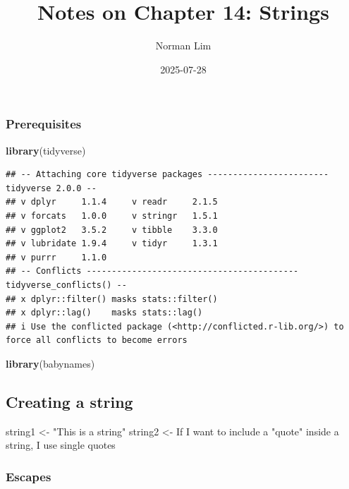 \documentclass[
]{article}
\title{Notes on Chapter 14: Strings}
\author{Norman Lim}
\date{2025-07-28}
\newenvironment{Shaded}{\begin{snugshade}}{\end{snugshade}}
\newcommand{\FunctionTok}[1]{\textcolor[rgb]{0.13,0.29,0.53}{\textbf{#1}}}
\newcommand{\NormalTok}[1]{#1}
\newcommand{\OtherTok}[1]{\textcolor[rgb]{0.56,0.35,0.01}{#1}}
\newcommand{\StringTok}[1]{\textcolor[rgb]{0.31,0.60,0.02}{#1}}
\begin{document}
\maketitle

\subsubsection{Prerequisites}\label{prerequisites}

\begin{Shaded}
\begin{Highlighting}[]
\FunctionTok{library}\NormalTok{(tidyverse)}
\end{Highlighting}
\end{Shaded}

\begin{verbatim}
## -- Attaching core tidyverse packages ------------------------ tidyverse 2.0.0 --
## v dplyr     1.1.4     v readr     2.1.5
## v forcats   1.0.0     v stringr   1.5.1
## v ggplot2   3.5.2     v tibble    3.3.0
## v lubridate 1.9.4     v tidyr     1.3.1
## v purrr     1.1.0     
## -- Conflicts ------------------------------------------ tidyverse_conflicts() --
## x dplyr::filter() masks stats::filter()
## x dplyr::lag()    masks stats::lag()
## i Use the conflicted package (<http://conflicted.r-lib.org/>) to force all conflicts to become errors
\end{verbatim}

\begin{Shaded}
\begin{Highlighting}[]
\FunctionTok{library}\NormalTok{(babynames)}
\end{Highlighting}
\end{Shaded}

\subsection{Creating a string}\label{creating-a-string}

\begin{Shaded}
\begin{Highlighting}[]
\NormalTok{string1 }\OtherTok{\textless{}{-}} \StringTok{"This is a string"}
\NormalTok{string2 }\OtherTok{\textless{}{-}} \StringTok{\textquotesingle{}If I want to include a "quote" inside a string, I use single quotes\textquotesingle{}}
\end{Highlighting}
\end{Shaded}

\subsubsection{Escapes}\label{escapes}
\end{document}
